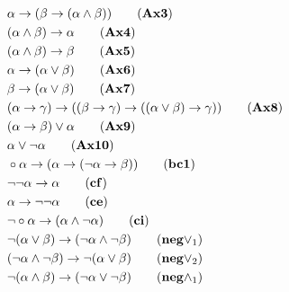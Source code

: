 \begin{definicao}[\lfium{}]
\begin{align*}
        & \alpha \rightarrow (\beta \rightarrow (\alpha \land \beta))\tag{\textbf{Ax3}}                                                                       \\
        & (\alpha \land \beta) \rightarrow \alpha\tag{\textbf{Ax4}}                                                                                           \\
        & (\alpha \land \beta) \rightarrow \beta\tag{\textbf{Ax5}}                                                                                            \\
        & \alpha \rightarrow (\alpha \lor \beta)\tag{\textbf{Ax6}}                                                                                            \\
        & \beta \rightarrow (\alpha \lor \beta)\tag{\textbf{Ax7}}                                                                                             \\
        & (\alpha \rightarrow \gamma) \rightarrow ((\beta \rightarrow \gamma) \rightarrow ((\alpha \lor \beta) \rightarrow \gamma))\tag{\textbf{Ax8}}         \\
        & (\alpha \rightarrow \beta) \lor \alpha\tag{\textbf{Ax9}}                                                                                           \\
        & \alpha \lor \neg \alpha\tag{\textbf{Ax10}}                                                                                                          \\
        & \circ \alpha \rightarrow (\alpha \rightarrow (\neg \alpha \rightarrow \beta))\tag{\textbf{bc1}}                                                     \\
        & \neg \neg \alpha \rightarrow \alpha\tag{\textbf{cf}}
        \\
        & \alpha \rightarrow \neg \neg \alpha\tag{\textbf{ce}}
        \\
        & \neg \circ \alpha \rightarrow (\alpha \land \neg \alpha)\tag{\textbf{ci}}                                                                           \\
        & \neg (\alpha \lor \beta) \rightarrow (\neg \alpha \land \neg \beta)\tag{\textbf{neg}$\lor_{1}$}\\
        & (\neg \alpha \land \neg \beta) \rightarrow \neg (\alpha \lor \beta)\tag{\textbf{neg}$\lor_{2}$}\\
        & \neg(\alpha \land \beta) \rightarrow (\neg \alpha \lor \neg \beta)\tag{\textbf{neg}$\land_{1}$}\\

\end{align*}
\end{definicao}
